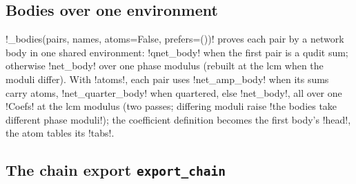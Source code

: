 {{{\subsection{Bodies over one environment}

\lexpy!_bodies(pairs, names, atoms=False, prefers=())! proves each pair by a network body in one
shared environment: \lexpy!qnet_body! when the first pair is a qudit sum; otherwise \lexpy!net_body!
over one phase modulus (rebuilt at the lcm when the moduli differ). With \lexcode!atoms!, each pair
uses \lexpy!net_amp_body! when its sums carry atoms, \lexpy!net_quarter_body! when quartered, else
\lexpy!net_body!, all over one \lexpy!Coefs! at the lcm modulus (two passes; differing moduli raise
\lexcode!the bodies take different phase moduli!); the coefficient definition becomes the first
body's \lexpy!head!, the atom tables its \lexpy!tabs!.

\subsection{The chain export \texttt{export\_chain}}

}}}
